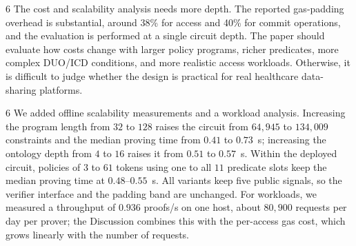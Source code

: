 \begin{reviewcomment}{6}
	The cost and scalability analysis needs more depth.
	The reported gas-padding overhead is substantial, around 38\% for access and 40\% for commit operations, and the evaluation is performed at a single circuit depth.
	The paper should evaluate how costs change with larger policy programs, richer predicates, more complex DUO/ICD conditions, and more realistic access workloads.
	Otherwise, it is difficult to judge whether the design is practical for real healthcare data-sharing platforms.
\end{reviewcomment}

\begin{reviewresponse}{6}
	We added offline scalability measurements and a workload analysis.
	Increasing the program length from $32$ to $128$ raises the circuit from $64{,}945$ to $134{,}009$ constraints and the median proving time from $0.41$ to $0.73$~s; increasing the ontology depth from $4$ to $16$ raises it from $0.51$ to $0.57$~s.
	Within the deployed circuit, policies of $3$ to $61$ tokens using one to all $11$ predicate slots keep the median proving time at $0.48$--$0.55$~s.
	All variants keep five public signals, so the verifier interface and the padding band are unchanged.
	For workloads, we measured a throughput of $0.936$ proofs/s on one host, about $80{,}900$ requests per day per prover; the Discussion combines this with the per-access gas cost, which grows linearly with the number of requests.

\end{reviewresponse}
